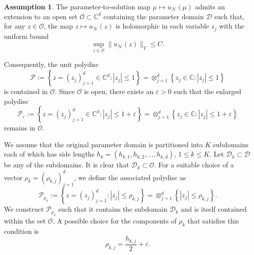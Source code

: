 \documentclass[12pt]{article}
\theoremstyle{remark}
\theoremstyle{definition}
\newtheorem{assumption}{Assumption}
\numberwithin{equation}{section}
\begin{document}
\begin{assumption}
The parameter-to-solution map $\mu \mapsto u_{\mathcal{N}}(\mu)$ admits an extension to an open set $\mathcal{O} \subset \mathbb{C}^d$ containing the parameter domain $\mathcal{D}$ such that, for any $z \in \mathcal{O}$, the map $z \mapsto u_{\mathcal{N}}(z)$ is holomorphic in each variable $z_j$ with the uniform bound
\begin{equation}
    \sup_{z \in \mathcal{O}} \|u_{\mathcal{N}}(z)\|_V \leq C.
\end{equation}
\label{assump para}
\end{assumption}

Consequently, the unit polydisc
\begin{equation}
    \mathcal{P} := \left\{z = \left(z_j\right)_{j=1}^d \in \mathbb{C}^d : \left|z_j\right| \leq 1\right\} = \otimes_{j=1}^d \left\{z_j\in \mathbb{C} : \left|z_j\right| \leq 1\right\}
\end{equation}
is contained in $\mathcal{O}$. Since $\mathcal{O}$ is open, there exists an $\varepsilon>0$ such that the enlarged polydisc
\begin{equation}
    \mathcal{P}_{\varepsilon}:=\left\{z=\left(z_j\right)_{j=1}^d\in \mathbb{C}^d :\left|z_j\right| \leq 1+\varepsilon \right\}=\otimes_{j=1}^d \left\{z_j\in \mathbb{C} : \left|z_j\right| \leq 1+\varepsilon\right\}
\end{equation}
remains in $\mathcal{O}$.

We assume that the original parameter domain is partitioned into $K$ subdomains each of which has side lengths $h_k=(h_{k,1},h_{k,2},...,h_{k,d})$, $1 \leq k \leq K$. Let ${\mathcal{D}}_k\subset \mathcal{D}$ be any of the subdomains. It is clear that ${\mathcal{D}}_k\subset \mathcal{O}$. For a suitable choice of a vector $\rho_{k} = (\rho_{k,j})_{j=1}^d$, we define the associated polydisc as  
\begin{equation}
    \mathcal{P}_{\rho_k}:=\left\{z=\left(z_j\right)_{j=1}^d:\left|z_j\right| \leq \rho_{k,j} \right\}=\otimes_{j=1}^d\left\{\left|z_j\right| \leq \rho_{k,j} \right\}.
    \label{poly vec}
\end{equation}
We construct $\mathcal{P}_{\rho_k}$ such that it contains the subdomain $\mathcal{D}_k$ and is itself contained within the set $\mathcal{O}$. A possible choice for the components of $\rho_k$ that satisfies this condition is
\begin{equation}
    \rho_{k,j}=\frac{h_{k,j}}{2}+\varepsilon.
\end{equation}
\end{document}
